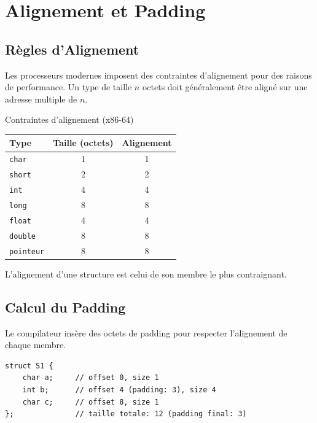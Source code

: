 \documentclass[10pt,a4paper]{article}
\begin{document}
\section{Alignement et Padding}

\subsection{Règles d'Alignement}

Les processeurs modernes imposent des contraintes d'alignement pour des raisons de performance. Un type de taille $n$ octets doit généralement être aligné sur une adresse multiple de $n$.

\begin{definitionbox}{Contraintes d'alignement (x86-64)}
\begin{center}
\begin{tabular}{|l|c|c|}
\hline
\textbf{Type} & \textbf{Taille (octets)} & \textbf{Alignement} \\
\hline
\texttt{char} & 1 & 1 \\
\texttt{short} & 2 & 2 \\
\texttt{int} & 4 & 4 \\
\texttt{long} & 8 & 8 \\
\texttt{float} & 4 & 4 \\
\texttt{double} & 8 & 8 \\
\texttt{pointeur} & 8 & 8 \\
\hline
\end{tabular}
\end{center}
L'alignement d'une structure est celui de son membre le plus contraignant.
\end{definitionbox}

\subsection{Calcul du Padding}

Le compilateur insère des octets de padding pour respecter l'alignement de chaque membre.

\begin{lstlisting}
struct S1 {
    char a;     // offset 0, size 1
    int b;      // offset 4 (padding: 3), size 4
    char c;     // offset 8, size 1
};              // taille totale: 12 (padding final: 3)
\end{lstlisting}
\end{document}
